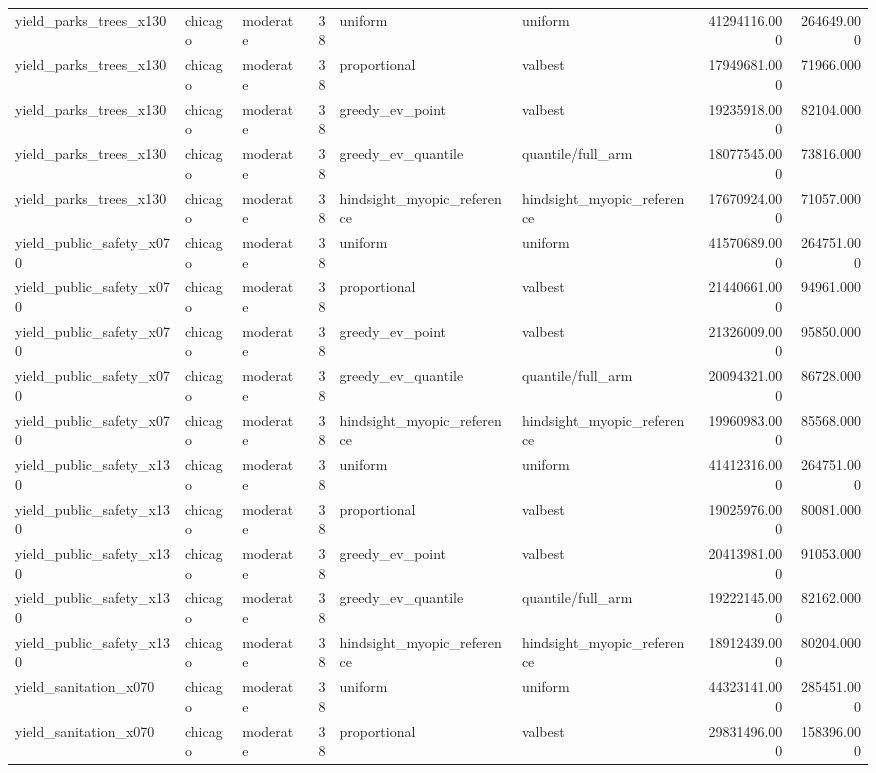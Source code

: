 \begin{tabular}{lllrllrr}
yield\_parks\_trees\_x130 & chicago & moderate & 38 & uniform & uniform & 41294116.000 & 264649.000 \\
yield\_parks\_trees\_x130 & chicago & moderate & 38 & proportional & valbest & 17949681.000 & 71966.000 \\
yield\_parks\_trees\_x130 & chicago & moderate & 38 & greedy\_ev\_point & valbest & 19235918.000 & 82104.000 \\
yield\_parks\_trees\_x130 & chicago & moderate & 38 & greedy\_ev\_quantile & quantile/full\_arm & 18077545.000 & 73816.000 \\
yield\_parks\_trees\_x130 & chicago & moderate & 38 & hindsight\_myopic\_reference & hindsight\_myopic\_reference & 17670924.000 & 71057.000 \\
yield\_public\_safety\_x070 & chicago & moderate & 38 & uniform & uniform & 41570689.000 & 264751.000 \\
yield\_public\_safety\_x070 & chicago & moderate & 38 & proportional & valbest & 21440661.000 & 94961.000 \\
yield\_public\_safety\_x070 & chicago & moderate & 38 & greedy\_ev\_point & valbest & 21326009.000 & 95850.000 \\
yield\_public\_safety\_x070 & chicago & moderate & 38 & greedy\_ev\_quantile & quantile/full\_arm & 20094321.000 & 86728.000 \\
yield\_public\_safety\_x070 & chicago & moderate & 38 & hindsight\_myopic\_reference & hindsight\_myopic\_reference & 19960983.000 & 85568.000 \\
yield\_public\_safety\_x130 & chicago & moderate & 38 & uniform & uniform & 41412316.000 & 264751.000 \\
yield\_public\_safety\_x130 & chicago & moderate & 38 & proportional & valbest & 19025976.000 & 80081.000 \\
yield\_public\_safety\_x130 & chicago & moderate & 38 & greedy\_ev\_point & valbest & 20413981.000 & 91053.000 \\
yield\_public\_safety\_x130 & chicago & moderate & 38 & greedy\_ev\_quantile & quantile/full\_arm & 19222145.000 & 82162.000 \\
yield\_public\_safety\_x130 & chicago & moderate & 38 & hindsight\_myopic\_reference & hindsight\_myopic\_reference & 18912439.000 & 80204.000 \\
yield\_sanitation\_x070 & chicago & moderate & 38 & uniform & uniform & 44323141.000 & 285451.000 \\
yield\_sanitation\_x070 & chicago & moderate & 38 & proportional & valbest & 29831496.000 & 158396.000 \\

\end{tabular}

